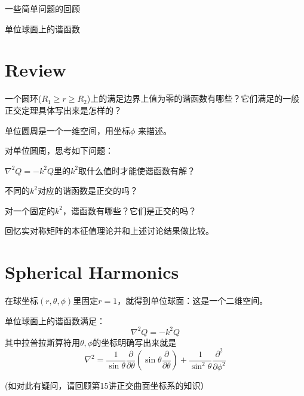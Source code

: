 \documentclass[CJK]{beamer}
\date{}
\begin{document}

\begin{frame}
\bch
\bitem
\item{一些简单问题的回顾}
\item{单位球面上的谐函数}
\eitem
\ech
\end{frame}


\section{Review}

\begin{frame}
  \bch
  
  一个圆环($R_1\ge r\ge R_2$)上的满足边界上值为零的谐函数有哪些？它们满足的一般正交定理具体写出来是怎样的？
  
  \ech
\end{frame}


\begin{frame}
  \bch
  单位圆周是一个一维空间，用坐标$\phi$ 来描述。

  \skiplines
  
  对单位圆周，思考如下问题：
  \emini
  \emini

  \bitem
\item{$\nabla^2Q = -k^2Q$里的$k^2$取什么值时才能使谐函数有解？}
\item{不同的$k^2$对应的谐函数是正交的吗？}
\item{对一个固定的$k^2$，谐函数有哪些？它们是正交的吗？}
\item{回忆实对称矩阵的本征值理论并和上述讨论结果做比较。}
  \eitem
  \ech
\end{frame}

\section{Spherical Harmonics}


\begin{frame}
\bch
在球坐标$(r,\theta,\phi)$里固定$r=1$，就得到单位球面：这是一个二维空间。

\skipline

单位球面上的谐函数满足：
$$ \nabla^2Q = -k^2Q $$
其中拉普拉斯算符用$\theta,\phi$的坐标明确写出来就是
$$ \nabla^2 = \frac{1}{\sin\theta}\frac{\partial}{\partial\theta}\left(\sin\theta\frac{\partial}{\partial\theta}\right) + \frac{1}{\sin^2\theta}\frac{\partial^2}{\partial\phi^2} $$

{\scriptsize (如对此有疑问，请回顾第15讲正交曲面坐标系的知识）}
\ech
\end{frame}
\end{document}

